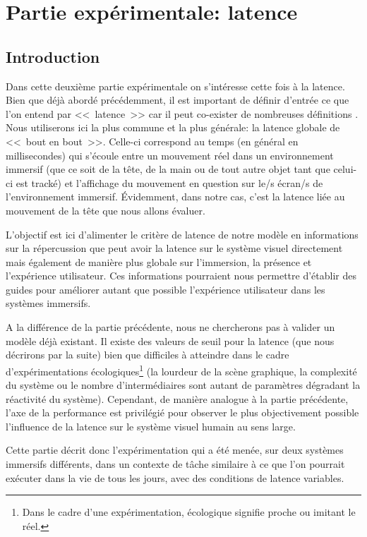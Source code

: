 \part{Partie expérimentale: latence}

\chapter*{Introduction}
\par Dans cette deuxième partie expérimentale on s'intéresse cette fois à la latence. Bien que déjà abordé précédemment, il est important de définir d'entrée ce que l'on entend par <<~latence~>> car il peut co-exister de nombreuses définitions \citep{papadakis_system_2011, hale_handbook_2015, watson_effects_1998}. Nous utiliserons ici la plus commune et la plus générale: la latence globale de <<~bout en bout~>>. Celle-ci correspond au temps (en général en millisecondes) qui s'écoule entre un mouvement réel dans un environnement immersif (que ce soit de la tête, de la main ou de tout autre objet tant que celui-ci est tracké) et l'affichage du mouvement en question sur le/s écran/s de l'environnement immersif. Évidemment, dans notre cas, c'est la latence liée au mouvement de la tête que nous allons évaluer.

\par L'objectif est ici d'alimenter le critère de latence de notre modèle en informations sur la répercussion que peut avoir la latence sur le système visuel directement mais également de manière plus globale sur l'immersion, la présence et l'expérience utilisateur. Ces informations pourraient nous permettre d'établir des guides pour améliorer autant que possible l'expérience utilisateur dans les systèmes immersifs.

\par A la différence de la partie précédente, nous ne chercherons pas à valider un modèle déjà existant. Il existe des valeurs de seuil pour la latence (que nous décrirons par la suite) bien que difficiles à atteindre dans le cadre d'expérimentations écologiques\footnote{Dans le cadre d'une expérimentation, écologique signifie proche ou imitant le réel.} (la lourdeur de la scène graphique, la complexité du système ou le nombre d'intermédiaires sont autant de paramètres dégradant la réactivité du système). Cependant, de manière analogue à la partie précédente, l'axe de la performance est privilégié pour observer le plus objectivement possible l'influence de la latence sur le système visuel humain au sens large.

\par Cette partie décrit donc l'expérimentation qui a été menée, sur deux systèmes immersifs différents, dans un contexte de tâche similaire à ce que l'on pourrait exécuter dans la vie de tous les jours, avec des conditions de latence variables.